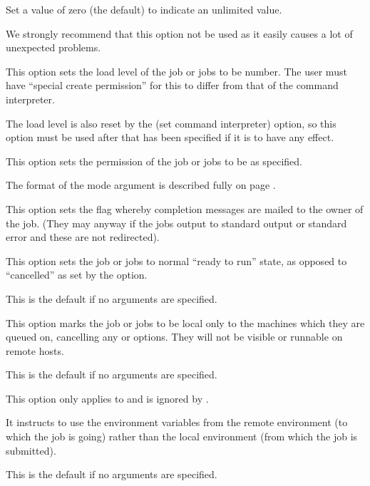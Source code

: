 Set a value of zero (the default) to indicate an unlimited value.

We strongly recommend that this option not be used as it easily causes a lot of unexpected problems.


This option sets the load level of the job or jobs to be number. The user must have ``special create permission'' for this to differ from that of the
command interpreter.

The load level is also reset by the  (set command interpreter) option, so this option must be used after that has been specified if it is to have any effect.


This option sets the permission of the job or jobs to be as specified.

The format of the mode argument is described fully on page \pageref{btr:modefmt}.


This option sets the flag whereby completion messages are mailed to the owner of the job. (They may anyway if the jobs output to standard
output or standard error and these are not redirected).


This option sets the job or jobs to normal ``ready to run'' state, as opposed to ``cancelled'' as set by the  option.

This is the default if no arguments are specified.


This option marks the job or jobs to be local only to the machines which they are queued on, cancelling any  or 
options. They will not be visible or runnable on remote hosts.

This is the default if no arguments are specified.


This option only applies to \PrRbtr{} and is ignored by \PrBtr{}.

It instructs \PrRbtr{} to use the environment variables from the remote environment (to which the job is going) rather than the local
environment (from which the job is submitted).

This is the default if no arguments are specified.

